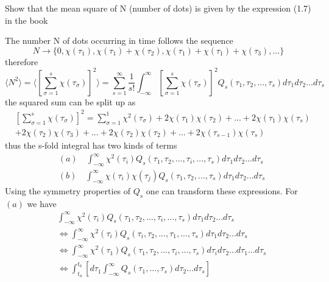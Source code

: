 

Show that the mean square of N (number of dots) is given by the expression (1.7) in the book

The number N of dots occurring in time follows the sequence
\begin{equation}
N \rightarrow \{0,\chi(\tau_1),\chi(\tau_1)+\chi(\tau_2),\chi(\tau_1)+\chi(\tau_1)+\chi(\tau_3),...\}
\end{equation}
therefore
\begin{equation}
\langle N^2\rangle=\langle \left[\sum_{\sigma=1}^s \chi(\tau_{\sigma})\right]^2\rangle=\sum_{s=1}^{\infty}\frac{1}{s!}\int_{-\infty}^{\infty}\left[\sum_{\sigma=1}^s \chi(\tau_{\sigma})\right]^2Q_s(\tau_1,\tau_2,...,\tau_s)d\tau_1d\tau_2...d\tau_s
\end{equation}
the squared sum can be split up as
\begin{equation}
\begin{split}
&\left[ \sum_{\sigma=1}^s \chi(\tau_{\sigma}) \right]^2=\sum_{\sigma=1}^1 \chi^2(\tau_{\sigma})+2\chi(\tau_{1})\chi(\tau_{2})+...+2\chi(\tau_{1})\chi(\tau_{s})\\
&+2\chi(\tau_{2})\chi(\tau_{3})+...+2\chi(\tau_{2})\chi(\tau_{2})+...+2\chi(\tau_{s-1})\chi(\tau_{s})
\end{split}
\end{equation}
thus the s-fold integral has two kinds of terms
\begin{equation}
\begin{split}
&(a)\quad \int_{-\infty}^{\infty}\chi^2(\tau_i)Q_s(\tau_1,\tau_2,...,\tau_i,...,\tau_s)d\tau_1d\tau_2...d\tau_s\\
&(b) \quad \int_{-\infty}^{\infty}\chi(\tau_i)\chi(\tau_j)Q_s(\tau_1,\tau_2,...,\tau_s)d\tau_1d\tau_2...d\tau_s 
\end{split}
\end{equation}
Using the symmetry properties of $Q_s$ one can transform these expressions. For $(a)$ we have
\begin{equation}
\begin{split}
& \int_{-\infty}^{\infty}\chi^2(\tau_i)Q_s(\tau_1,\tau_2,...,\tau_i,...,\tau_s)d\tau_1d\tau_2...d\tau_s\\
& \Leftrightarrow \int_{-\infty}^{\infty}\chi^2(\tau_i)Q_s(\tau_i,\tau_2,...,\tau_1,...,\tau_s)d\tau_1d\tau_2...d\tau_s \\
& \Leftrightarrow \int_{-\infty}^{\infty}\chi^2(\tau_1)Q_s(\tau_1,\tau_2,...,\tau_i,...,\tau_s)d\tau_id\tau_2...d\tau_1...d\tau_s \\
& \Leftrightarrow\int_{t_a}^{t_b}\left[d\tau_1 \int_{-\infty}^{\infty}Q_s(\tau_1,...,\tau_s)d\tau_2...d\tau_s \right]
\end{split}
\end{equation}
